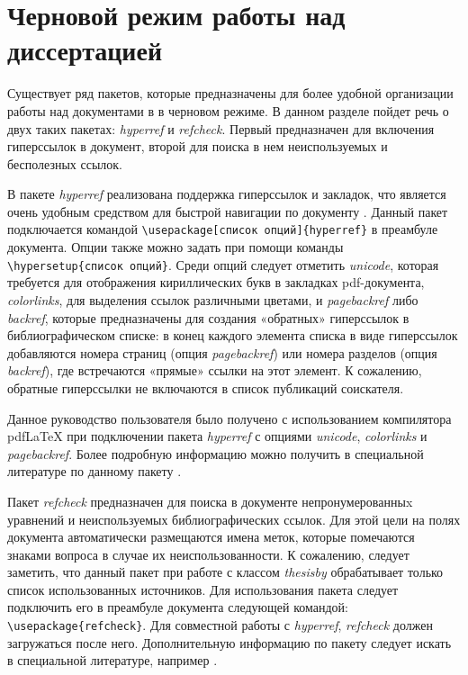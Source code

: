 \section{Черновой режим работы над диссертацией}
\label{chap:draft}

Существует ряд пакетов, которые предназначены для более удобной организации
работы над документами в \LaTeXe{} в черновом режиме. В данном разделе пойдет
речь о двух  таких пакетах: {\itshape hyperref} и {\itshape refcheck}. Первый
предназначен для включения гиперссылок в документ, второй для поиска в нем
неиспользуемых и бесполезных ссылок.

В пакете {\itshape hyperref} реализована поддержка гиперссылок и закладок, что является очень удобным средством для быстрой навигации по документу \cite{hyperref}. Данный пакет подключается командой \verb|\usepackage[список опций]{hyperref}| в преамбуле документа. Опции также можно задать при помощи команды \verb|\hypersetup{список опций}|. Среди опций следует отметить {\itshape unicode}, которая требуется для отображения кириллических букв в закладках pdf-документа, {\itshape colorlinks}, для выделения ссылок различными цветами, и {\itshape pagebackref} либо {\itshape  backref}, которые предназначены для создания «обратных» гиперссылок в библиографическом списке: в конец каждого элемента списка в виде гиперссылок добавляются номера страниц (опция {\itshape pagebackref}) или номера разделов (опция {\itshape backref}), где встречаются «прямые» ссылки на этот элемент. К сожалению, обратные гиперссылки не включаются в список публикаций соискателя.

Данное руководство пользователя было получено с использованием
компилятора pdf\LaTeX{} при подключении пакета {\itshape hyperref} с опциями {\itshape unicode},  {\itshape colorlinks} и {\itshape pagebackref}. Более подробную информацию можно получить в специальной литературе по данному пакету \cite{hyperref,hyperrefop}.

Пакет {\itshape refcheck} предназначен для поиска в документе непронумерованныx уравнений и неиспользуемых библиографических ссылок. Для этой цели на полях документа автоматически размещаются имена меток, которые помечаются знаками вопроса в случае их неиспользованности. К сожалению, следует заметить, что данный пакет при работе с классом {\itshape thesisby} обрабатывает только список использованных источников. Для использования пакета следует подключить его в преамбуле документа следующей командой: \verb|\usepackage{refcheck}|. Для совместной работы с {\itshape hyperref}, {\itshape refcheck} должен загружаться после него. Дополнительную информацию по пакету следует искать в специальной литературе, например \cite{refcheck}.


